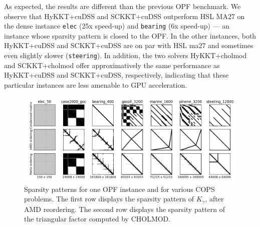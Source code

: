 As expected, the results are different than the previous OPF benchmark.
We observe that HyKKT+cuDSS and SCKKT+cuDSS outperform HSL MA27 on the dense instance {\tt elec}
(25x speed-up) and {\tt bearing} (6x speed-up) --- an instance whose sparsity pattern
is closed to the OPF. In the other instances, both HyKKT+cuDSS and SCKKT+cuDSS are
on par with HSL ma27 and sometimes even slightly slower ({\tt steering}).
In addition, the two solvers HyKKT+cholmod and SCKKT+cholmod offer approximatively
the same performance as HyKKT+cuDSS and SCKKT+cuDSS, respectively, indicating that these
particular instances are less amenable to GPU acceleration.

\begin{figure}[!ht]
  \centering
  \includegraphics[width=.9\textwidth]{../figures/sparsity_pattern.png}
  \caption{Sparsity patterns for one OPF instance and for various
    COPS problems. The first row displays the sparsity pattern
    of $K_\gamma$, after AMD reordering. The second row displays
    the sparsity pattern of the triangular factor computed by CHOLMOD.
    \label{fig:cops:nnz}
  }
\end{figure}


